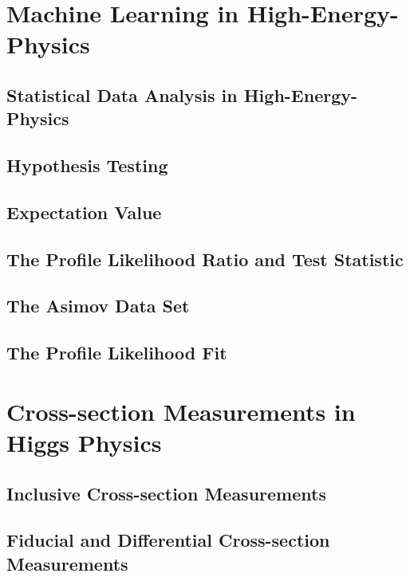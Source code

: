 



\chapter{Machine Learning in High-Energy-Physics}

\section{Statistical Data Analysis in High-Energy-Physics}
\section{Hypothesis Testing}
\section{Expectation Value}
\section{The Profile Likelihood Ratio and Test Statistic}
\section{The Asimov Data Set}
\section{The Profile Likelihood Fit}

\chapter{Cross-section Measurements in Higgs Physics}
\section{Inclusive Cross-section Measurements}
\section{Fiducial and Differential Cross-section Measurements}

